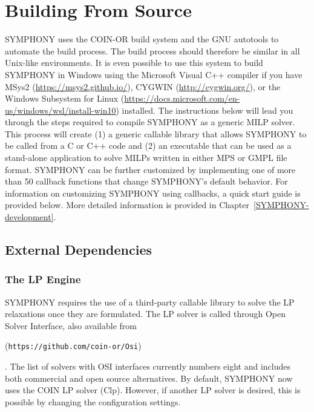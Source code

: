 

\section{Building From Source} 
\label{building_from_source}

SYMPHONY uses the COIN-OR build system and the GNU autotools to automate the
build process. The build process should therefore be similar in all
Unix-like environments. It is even possible to use this system to build SYMPHONY
in Windows using the Microsoft Visual C++ compiler if you have MSys2
(\url{https://msys2.github.io/}), CYGWIN (\url{http://cygwin.org/}), or the
Windows Subsystem for Linux
(\url{https://docs.microsoft.com/en-us/windows/wsl/install-win10}) installed.
The instructions below will lead you through the steps required to compile
SYMPHONY as a generic MILP solver. This process will create (1) a generic
callable library that allows SYMPHONY to be called from a C or C++ code and
(2) an executable that can be used as a stand-alone application to solve MILPs
written in either MPS or GMPL file format. SYMPHONY can be further customized
by implementing one of more than 50 callback functions that change SYMPHONY's
default behavior. For information on customizing SYMPHONY using callbacks, a
quick start guide is provided below. More detailed information is provided in
Chapter~\ref{SYMPHONY-development}.

\subsection{External Dependencies}

\subsubsection{The LP Engine} SYMPHONY requires the use of a third-party
  callable library to solve the LP relaxations once they are formulated. The
LP solver is called through Open Solver Interface, also available from
\begin{latexonly} 
(\texttt{https://github.com/coin-or/Osi})
\end{latexonly}.
The list of solvers with OSI interfaces currently numbers eight and includes
both commercial and open source alternatives. By default, SYMPHONY now uses
the COIN LP solver (Clp). However, if another LP solver is desired, this is
possible by changing the configuration settings.


